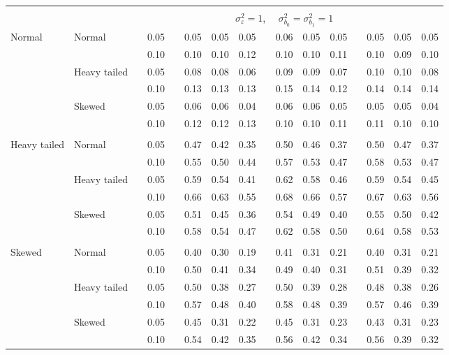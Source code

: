 \documentclass{article} %
\begin{document}
\begin{table}[ht]
\begin{scriptsize}
\begin{center}
\begin{tabular}{ll p{.1cm} c p{.1cm} rrr p{.1cm} rrr p{.1cm} rrr}
&&&&&&&&&&&&&&&\\
& && && \multicolumn{9}{c}{$\sigma_{\varepsilon}^2 = 1$, \ \ $\sigma_{b_0}^2 = \sigma_{b_1}^2 = 1$} \\ \cline{6-16}
\rowcolor{gray!20}Normal       & Normal       && 0.05 &&   0.05 & 0.05 & 0.05 && 0.06 & 0.05 & 0.05 &&  0.05 & 0.05 & 0.05 \\
\rowcolor{gray!20}             &              && 0.10 &&   0.10 & 0.10 & 0.12 && 0.10 & 0.10 & 0.11 &&  0.10 & 0.09 & 0.10 \\
\rowcolor{gray!20}             & Heavy tailed && 0.05 &&   0.08 & 0.08 & 0.06 && 0.09 & 0.09 & 0.07 &&  0.10 & 0.10 & 0.08 \\
\rowcolor{gray!20}             &              && 0.10 &&   0.13 & 0.13 & 0.13 && 0.15 & 0.14 & 0.12 &&  0.14 & 0.14 & 0.14 \\
\rowcolor{gray!20}             & Skewed       && 0.05 &&   0.06 & 0.06 & 0.04 && 0.06 & 0.06 & 0.05 &&  0.05 & 0.05 & 0.04 \\
\rowcolor{gray!20}             &              && 0.10 &&   0.12 & 0.12 & 0.13 && 0.10 & 0.10 & 0.11 &&  0.11 & 0.10 & 0.10 \\
             &&&&&&&&&&&&&&&\\
Heavy tailed & Normal       && 0.05 &&   0.47 & 0.42 & 0.35 && 0.50 & 0.46 & 0.37 && 0.50 & 0.47 & 0.37 \\
             &              && 0.10 &&   0.55 & 0.50 & 0.44 && 0.57 & 0.53 & 0.47 && 0.58 & 0.53 & 0.47 \\
             & Heavy tailed && 0.05 &&   0.59 & 0.54 & 0.41 && 0.62 & 0.58 & 0.46 && 0.59 & 0.54 & 0.45 \\
             &              && 0.10 &&   0.66 & 0.63 & 0.55 && 0.68 & 0.66 & 0.57 && 0.67 & 0.63 & 0.56 \\
             & Skewed       && 0.05 &&   0.51 & 0.45 & 0.36 && 0.54 & 0.49 & 0.40 && 0.55 & 0.50 & 0.42 \\
             &              && 0.10 &&   0.58 & 0.54 & 0.47 && 0.62 & 0.58 & 0.50 && 0.64 & 0.58 & 0.53 \\
             &&&&&&&&&&&&&&&\\
Skewed       & Normal       && 0.05 &&   0.40 & 0.30 & 0.19 && 0.41 & 0.31 & 0.21 &&  0.40 & 0.31 & 0.21 \\
             &              && 0.10 &&   0.50 & 0.41 & 0.34 && 0.49 & 0.40 & 0.31 &&  0.51 & 0.39 & 0.32 \\
             & Heavy tailed && 0.05 &&   0.50 & 0.38 & 0.27 && 0.50 & 0.39 & 0.28 &&  0.48 & 0.38 & 0.26 \\
             &              && 0.10 &&   0.57 & 0.48 & 0.40 && 0.58 & 0.48 & 0.39 &&  0.57 & 0.46 & 0.39 \\
             & Skewed       && 0.05 &&   0.45 & 0.31 & 0.22 && 0.45 & 0.31 & 0.23 &&  0.43 & 0.31 & 0.23 \\
             &              && 0.10 &&   0.54 & 0.42 & 0.35 && 0.56 & 0.42 & 0.34 &&  0.56 & 0.39 & 0.32 \\




\end{tabular}
\end{center}
\end{scriptsize}
\end{table}
\end{document}

